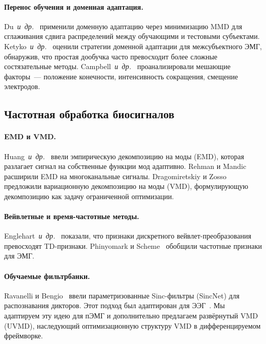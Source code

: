 \documentclass[conference]{IEEEtran}
\newcommand{\etal}{\mbox{\textit{и~др.}}}
\newcommand{\uvmd}{\textsc{UVMD}}
\begin{document}
\paragraph{Перенос обучения и доменная адаптация.}
Du~\etal~\cite{du2017surface} применили доменную адаптацию через минимизацию MMD для сглаживания сдвига распределений между обучающими и тестовыми субъектами.
Ketyko~\etal~\cite{ketyko2019domain} оценили стратегии доменной адаптации для межсубъектного ЭМГ, обнаружив, что простая дообучка часто превосходит более сложные состязательные методы.
Campbell~\etal~\cite{campbell2020current} проанализировали мешающие факторы~--- положение конечности, интенсивность сокращения, смещение электродов.

\subsection{Частотная обработка биосигналов}

\paragraph{EMD и VMD.}
Huang~\etal~\cite{huang1998empirical} ввели эмпирическую декомпозицию на моды (EMD), которая разлагает сигнал на собственные функции мод адаптивно.
Rehman и Mandic~\cite{rehman2010multivariate} расширили EMD на многоканальные сигналы.
Dragomiretskiy и Zosso~\cite{dragomiretskiy2014variational} предложили вариационную декомпозицию на моды (VMD), формулирующую декомпозицию как задачу ограниченной оптимизации.

\paragraph{Вейвлетные и время-частотные методы.}
Englehart~\etal~\cite{englehart1999wavelet} показали, что признаки дискретного вейвлет-преобразования превосходят TD-признаки.
Phinyomark и Scheme~\cite{phinyomark2018emg_frequency} обобщили частотные признаки для ЭМГ.

\paragraph{Обучаемые фильтрбанки.}
Ravanelli и Bengio~\cite{ravanelli2018speaker} ввели параметризованные Sinc-фильтры (SincNet) для распознавания дикторов. Этот подход был адаптирован для ЭЭГ~\cite{borra2020sincnet_eeg}.
Мы адаптируем эту идею для пЭМГ и дополнительно предлагаем развёрнутый VMD (\uvmd{}), наследующий оптимизационную структуру VMD в дифференцируемом фреймворке.
\end{document}

